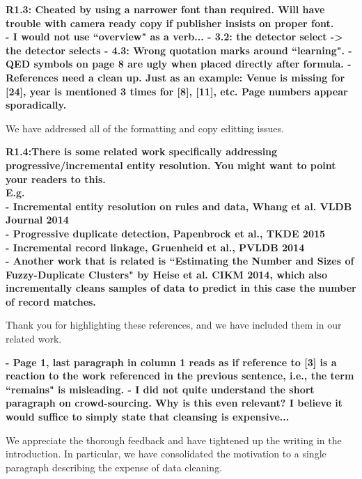 \vspace{0.5em}

\noindent\textbf{R1.3: Cheated by using a narrower font than required. Will have trouble with camera ready copy if publisher insists on proper font.\\
- I would not use ``overview" as a verb...
- 3.2: the detector select -> the detector selects
- 4.3: Wrong quotation marks around ``learning".
- QED symbols on page 8 are ugly when placed directly after formula. 
- References need a clean up. Just as an example: Venue is missing for [24], year is mentioned 3 times for [8], [11], etc. Page numbers appear sporadically.}

We have addressed all of the formatting and copy editting issues.

\vspace{0.5em}

\noindent\textbf{R1.4:There is some related work specifically addressing progressive/incremental entity resolution. You might want to point your readers to this.
\\E.g.
\\- Incremental entity resolution on rules and data, Whang et al. VLDB Journal 2014
\\- Progressive duplicate detection, Papenbrock et al., TKDE 2015
\\- Incremental record linkage, Gruenheid et al., PVLDB 2014
\\- Another work that is related is ``Estimating the Number and Sizes of Fuzzy-Duplicate Clusters" by Heise et al. CIKM 2014, which also incrementally cleans samples of data to predict in this case the number of record matches.}

Thank you for highlighting these references, and we have included them in our related work.

\vspace{0.5em}

\noindent\textbf{- Page 1, last paragraph in column 1 reads as if reference to [3] is a reaction to the work referenced in the previous sentence, i.e., the term ``remains" is misleading.
- I did not quite understand the short paragraph on crowd-sourcing. Why is this even relevant?
 I believe it would suffice to simply state that cleansing is expensive...}

We appreciate the thorough feedback and have tightened up the writing in the introduction. In particular, we have consolidated the motivation to a single paragraph describing the expense of data cleaning.


